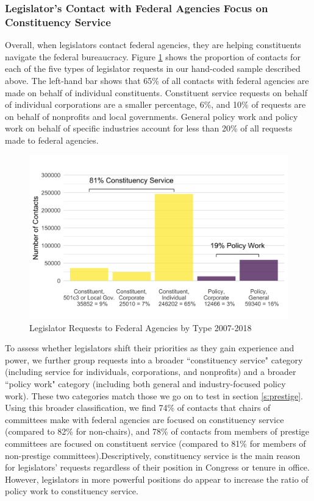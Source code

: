 \documentclass[12pt]{article}
\begin{document}
\subsubsection{Legislator's Contact with Federal Agencies Focus on Constituency Service}
Overall, when legislators contact federal agencies, they are helping constituents navigate the federal bureaucracy. Figure \ref{f:type2} shows the proportion of contacts for each of the five types of legislator requests in our hand-coded sample described above. The left-hand bar shows that 65\% of all contacts with federal agencies are made on behalf of individual constituents. Constituent service requests on behalf of individual corporations are a smaller percentage, 6\%, and 10\% of requests are on behalf of nonprofits and local governments. General policy work and policy work on behalf of specific industries account for less than 20\% of all requests made to federal agencies.  


\begin{figure}[hbt!]
\centering
\caption{Legislator Requests to Federal Agencies by Type 2007-2018} \label{f:type2}
\includegraphics[width = .8\textwidth]{figs/data_by_type-tall-1}
\end{figure}



To assess whether legislators shift their priorities as they gain experience and power, we further group requests into a broader ``constituency service"  category (including service for individuals, corporations, and nonprofits) and a broader ``policy work" category (including both general and industry-focused policy work). These two categories match those we go on to test in section \ref{s:prestige}. Using this broader classification, we find 74\% of contacts that chairs of committees make with federal agencies are focused on constituency service (compared to 82\% for non-chairs), and 78\% of contacts from members of prestige committees are focused on constituent service (compared to 81\% for members of non-prestige committees).Descriptively, constituency service is the main reason for legislators' requests regardless of their position in Congress or tenure in office. However, legislators in more powerful positions do appear to increase the ratio of policy work to constituency service.  
\end{document}
